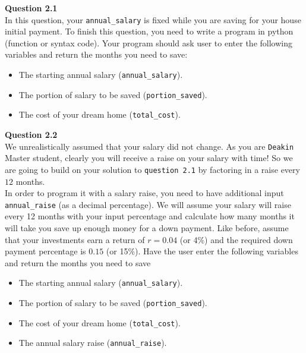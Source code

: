 \documentclass[a4paper]{article}
\begin{document}
\begin{answer}
    \textbf{Question 2.1} \\
 
    In this question, your \texttt{annual_salary} is fixed while you are saving for your house initial payment. 
    To finish this question, you need to write a program in python (function or syntax code). Your program should ask user to enter the following variables and return the months you need to save:
    \begin{itemize}
    \item The starting annual salary (\texttt{annual_salary}).
    \item The portion of salary to be saved (\texttt{portion_saved}).
    \item The cost of your dream home (\texttt{total_cost}).
    \end{itemize}

    \textbf{Question 2.2} \\
    
    We unrealistically assumed that your salary did not change. 
    As you are \texttt{Deakin} Master student, clearly you will receive a raise on your salary with time! So we are going to build on your solution to \texttt{question 2.1} by factoring in a raise every $12$ months.\\

    In order to program it with a salary raise, you need to have additional input \texttt{annual_raise} (as a decimal percentage). 
    We will assume your salary will raise every 12 months with your input percentage and calculate how many months it will take you save up enough money for a down payment. Like before, assume that your investments earn a return of $r = 0.04$ (or 4\%) and the required down payment percentage is $0.15$ (or 15\%). Have the user enter the following variables and return the months you need to save \\
    
    \begin{itemize}
        \item The starting annual salary (\texttt{annual_salary}).
        \item The portion of salary to be saved (\texttt{portion_saved}).
        \item The cost of your dream home (\texttt{total_cost}).
        \item The annual salary raise (\texttt{annual_raise}).
    \end{itemize}
           
    \end{answer}
    
    
\end{document}
